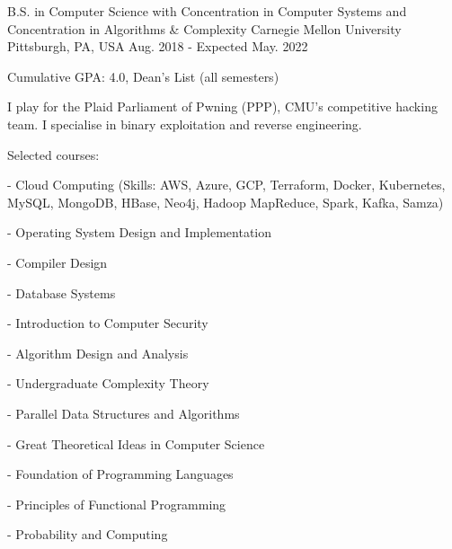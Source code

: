 

\begin{cventries}

  \cventry
    {B.S. in Computer Science with Concentration in Computer Systems and Concentration in Algorithms \& Complexity} %
    {Carnegie Mellon University} %
    {Pittsburgh, PA, USA} %
    {Aug. 2018 - Expected May. 2022} %
    {
      \begin{cvitems} %
      \item {Cumulative GPA: 4.0, Dean's List (all semesters)}
      \item {I play for the Plaid Parliament of Pwning (PPP), CMU's competitive hacking team. I specialise in binary exploitation and reverse engineering.}
      \item {Selected courses:}
      \item[-] {Cloud Computing (Skills: AWS, Azure, GCP, Terraform, Docker, Kubernetes, MySQL, MongoDB, HBase, Neo4j, Hadoop MapReduce, Spark, Kafka, Samza)}
        \setlength\multicolsep{0pt}
        \begin{multicols}{3}
          \item[-] {Operating System Design and Implementation}
          \item[-] {Compiler Design}
          \item[-] {Database Systems}
          \item[-] {Introduction to Computer Security}
          \item[-] {Algorithm Design and Analysis}
          \item[-] {Undergraduate Complexity Theory}
          \item[-] {Parallel Data Structures and Algorithms}
          \item[-] {Great Theoretical Ideas in Computer Science}
          \item[-] {Foundation of Programming Languages}
          \item[-] {Principles of Functional Programming}
          \item[-] {Probability and Computing}

\end{multicols}
\end{cvitems}}
\end{cventries}
